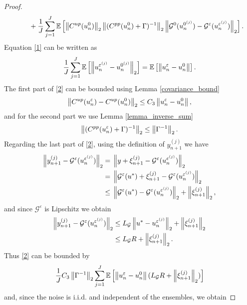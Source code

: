 \documentclass[10pt]{article}
\begin{document}
\begin{proof}
\begin{align}
& \qquad \quad + \frac{1}{J} \sum_{j=1}^J \mathbb{E} \left [ \left\|C^{up}(u_n^0)\right\|_2 \left\|(C^{pp}(u_n^0) + \Gamma)^{-1}\right\|_2 \left\|\mathcal{G}^0(u_n^{0^{(j)}}) - \mathcal{G}^{\varepsilon}(u_n^{\varepsilon^{(j)}})\right\|_2 \right ].
\end{align}
Equation \eqref{1} can be written as
\begin{equation}
\label{bound1}
\frac{1}{J} \sum_{j=1}^J \mathbb{E} \left [ \left\|u_n^{\varepsilon^{(j)}} - u_n^{0^{(j)}}\right\|_2 \right ] = \mathbb{E} \left [ \left\|u_n^{\varepsilon} - u_n^0\right\| \right ].
\end{equation}
The first part of \eqref{2} can be bounded using Lemma \ref{covariance_bound}
\begin{equation*}
\left\|C^{up}(u_n^{\varepsilon}) - C^{up}(u_n^0)\right\|_2 \le C_3 \left\|u_n^{\varepsilon} - u_n^0\right\|,
\end{equation*}
and for the second part we use Lemma \ref{lemma_inverse_sum}
\begin{equation*}
\left\|(C^{pp}(u_n^{\varepsilon}) + \Gamma)^{-1}\right\|_2 \le \left\|\Gamma^{-1}\right\|_2.
\end{equation*}
Regarding the last part of \eqref{2}, using the definition of $y_{n+1}^{(j)}$ we have
\begin{align*}
\left\|y_{n+1}^{(j)} - \mathcal{G}^{\varepsilon}(u_n^{\varepsilon^{(j)}})\right\|_2 = & \; \left\|y + \xi_{n+1}^{(j)} - \mathcal{G}^{\varepsilon}(u_n^{\varepsilon^{(j)}})\right\|_2 \\
= & \; \left\|\mathcal{G}^{\varepsilon}(u^*) + \xi_{n+1}^{(j)} - \mathcal{G}^{\varepsilon}(u_n^{\varepsilon^{(j)}})\right\|_2 \\
\le & \; \left\|\mathcal{G}^{\varepsilon}(u^*) - \mathcal{G}^{\varepsilon}(u_n^{\varepsilon^{(j)}})\right\|_2 + \left\|\xi_{n+1}^{(j)}\right\|_2,
\end{align*}
and since $\mathcal{G}^{\varepsilon}$ is Lipschitz we obtain
\begin{align*}
\left\|y_{n+1}^{(j)} - \mathcal{G}^{\varepsilon}(u_n^{\varepsilon^{(j)}})\right\|_2 \le & \; L_{\mathcal{G}} \left\|u^* - u_n^{\varepsilon^{(j)}}\right\|_2 + \left\|\xi_{n+1}^{(j)}\right\|_2 \\
\le & \; L_{\mathcal{G}} R + \left\|\xi_{n+1}^{(j)}\right\|_2.
\end{align*}
Thus \eqref{2} can be bounded by
\begin{equation*}
\frac{1}{J} C_3 \left\|\Gamma^{-1}\right\|_2 \sum_{j=1}^J \mathbb{E} \left [ \left\|u_n^{\varepsilon} - u_n^0\right\| (L_{\mathcal{G}} R + \left\|\xi_{n+1}^{(j)}\right\|_2) \right ]
\end{equation*}
and, since the noise is i.i.d. and independent of the ensembles, we obtain

\end{proof}
\end{document}
